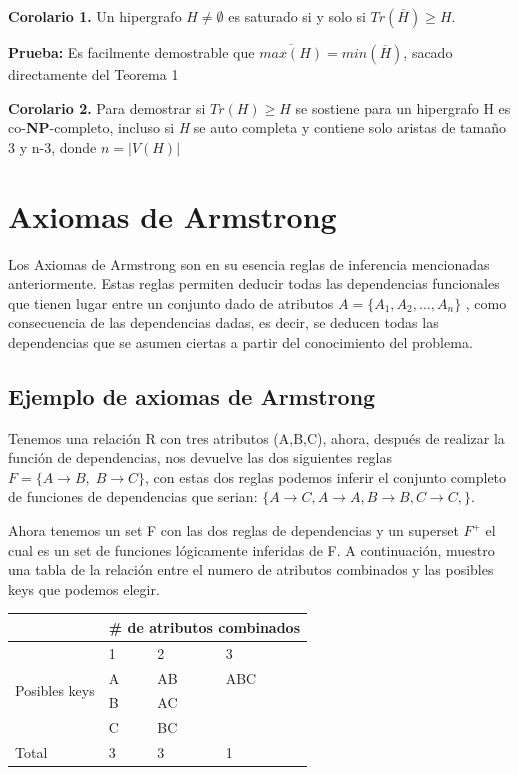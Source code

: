 \documentclass{cosas/tfg_domingo}
\begin{document}
\textbf{Corolario 1.} Un hipergrafo $H \neq \emptyset$ es saturado si y solo si $Tr(\overline{H}) \geq H$.

\textbf{Prueba:} Es facilmente demostrable que $\overline{max(H)} = min(\overline{H})$, sacado directamente del Teorema 1

\textbf{Corolario 2.} Para demostrar si $Tr(H) \geq H$ se sostiene para un hipergrafo H es co-\textbf{NP}-completo, incluso si \textit{H} se auto completa y contiene solo aristas de tamaño 3 y n-3, donde $n = |V(H)|$



\section{Axiomas de Armstrong}

Los Axiomas de Armstrong son en su esencia reglas de inferencia mencionadas anteriormente.
Estas reglas permiten deducir todas las dependencias funcionales que tienen
lugar entre un conjunto dado de atributos $A=\{A_1,A_2,...,A_n\}$ , como consecuencia de las dependencias dadas, es decir, se deducen todas las dependencias que se asumen ciertas a partir del conocimiento del problema.

\subsection{Ejemplo de axiomas de Armstrong}
Tenemos una relación R con tres atributos (A,B,C), ahora, después de realizar la función de dependencias, nos devuelve las dos siguientes reglas $F = \{A \rightarrow B , \; B \rightarrow C\}$, con estas dos reglas podemos inferir el conjunto completo de funciones de dependencias que serian: $\{ A \rightarrow C , A \rightarrow A , B \rightarrow B , C \rightarrow C ,\}$.

Ahora tenemos un set F con las dos reglas de dependencias y un superset $F^+$ el cual es un set de funciones lógicamente inferidas de F. A continuación, muestro una tabla de la relación entre el numero de atributos combinados y las posibles keys que podemos elegir.

\begin{table}[h]
\begin{tabular}{|l|l|l|l|}
\hline
                               & \multicolumn{3}{l|}{\# de atributos combinados} \\ \hline
\multirow{4}{*}{Posibles keys} & 1              & 2               & 3                \\ \cline{2-4} 
                               & A              & AB              & ABC              \\ \cline{2-4} 
                               & B              & AC              &                  \\ \cline{2-4} 
                               & C              & BC              &                  \\ \hline
Total                          & 3              & 3               & 1                \\ \hline
\end{tabular}
\end{table}
\end{document}
